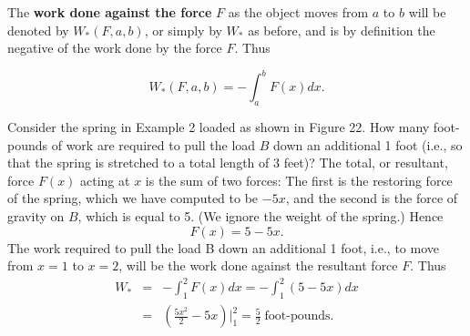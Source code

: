 The \textbf{work done against the force} $F$ as the object moves from $a$ to $b$ will be denoted by $W_*(F, a, b)$, or simply by $W_*$ as before, and is by definition
the negative of the work done by the force $F$. Thus

\begin{equation}
 W_*(F, a, b) = -\int_a^b F(x) dx. 
\label{eq8.5.6}
\end{equation}

\begin{example}
Consider the spring in Example 2 loaded as shown in Figure 22. How many foot-pounds of work are required to pull the load $B$ down an additional 1 foot (i.e., so that the spring is stretched to a total length of 3 feet)? The total, or resultant, force $F(x)$ acting at $x$ is the sum of two forces: The first is the restoring force of the spring, which we have computed to be $-5x$, and the second is the force of gravity on $B$, which is equal to 5. (We ignore the weight of the spring.) Hence
$$
F(x) = 5 - 5x.
$$
\noindent The work required to pull the load B down an additional 1 foot, i.e., to move from $x = 1$ to $x = 2$, will be the work done against the resultant force $F$. Thus
\begin{eqnarray*}
W_* &=& -\int_1^2  F(x)dx = -\int_1^2 (5 - 5x) dx \\
        &=& (\frac{5x^2}{2} - 5x)\big|_1^2 = \frac{5}{2} \;\mbox{foot-pounds}. 
\end{eqnarray*}
\end{example}


